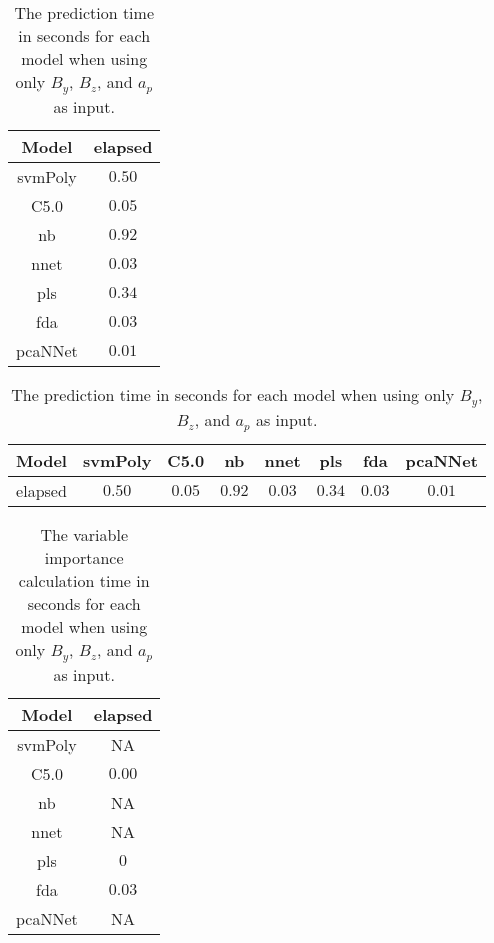\begin{table}[!ht]
	\centering
	\begin{tabular}{|c|c|}
		\hline
		Model & elapsed \\ \hline
		svmPoly & $0.50$ \\ \hline
		C5.0 & $0.05$ \\ \hline
		nb & $0.92$ \\ \hline
		nnet & $0.03$ \\ \hline
		pls & $0.34$ \\ \hline
		fda & $0.03$ \\ \hline
		pcaNNet & $0.01$ \\ \hline
	\end{tabular}
	\caption{The prediction time in seconds for each model when using only $B_{y}$, $B_{z}$, and $a_{p}$ as input.}
	\label{tab:time:yzap:predict}
\end{table}

\begin{table}[!ht]
	\centering
	\begin{tabular}{|c|c|c|c|c|c|c|c|}
		\hline
		Model & svmPoly & C5.0 & nb & nnet & pls & fda & pcaNNet \\ \hline
		elapsed & $0.50$ & $0.05$ & $0.92$ & $0.03$ & $0.34$ & $0.03$ & $0.01$ \\ \hline
	\end{tabular}
	\caption{The prediction time in seconds for each model when using only $B_{y}$, $B_{z}$, and $a_{p}$ as input.}
	\label{tab:time:reverse:yzap:predict}
\end{table}

\begin{table}[!ht]
	\centering
	\begin{tabular}{|c|c|}
		\hline
		Model & elapsed \\ \hline
		svmPoly & NA \\ \hline
		C5.0 & $0.00$ \\ \hline
		nb & NA \\ \hline
		nnet & NA \\ \hline
		pls & $0$ \\ \hline
		fda & $0.03$ \\ \hline
		pcaNNet & NA \\ \hline
	\end{tabular}
	\caption{The variable importance calculation time in seconds for each model when using only $B_{y}$, $B_{z}$, and $a_{p}$ as input.}
	\label{tab:time:yzap:importance}
\end{table}

